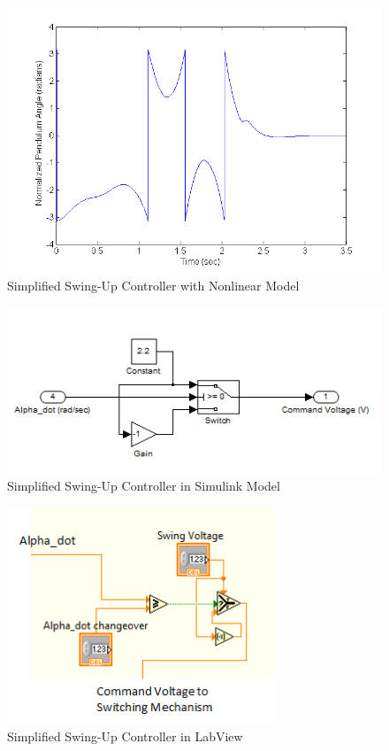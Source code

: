 \documentclass{article}
\theoremstyle{plain}
\theoremstyle{definition}
\theoremstyle{remark}
\begin{document}
\begin{figure}
\begin{center}
\includegraphics[width = 13cm]{Q9sim.png}
\end{center}
\caption{Simplified Swing-Up Controller with Nonlinear Model}
\label{q9_2}
\end{figure}

\begin{figure}
\begin{center}
\includegraphics[width = 12cm]{Q9simulink.png}
\end{center}
\caption{Simplified Swing-Up Controller in Simulink Model}
\label{q9_3}
\end{figure}

\begin{figure}
\begin{center}
\includegraphics[width = 8cm]{Q9labview.png}
\end{center}
\caption{Simplified Swing-Up Controller in LabView}
\label{q9_4}
\end{figure}
\end{document}
